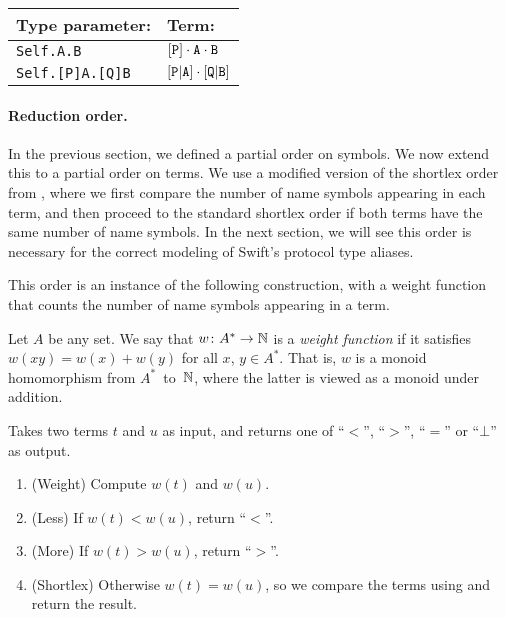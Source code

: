 \documentclass[../generics]{subfiles}
\begin{document}
\begin{center}
\begin{tabular}{ll}
\toprule
\textbf{Type parameter:}&\textbf{Term:}\\
\midrule
\texttt{Self.A.B}&$[\texttt{P}]\cdot\texttt{A}\cdot\texttt{B}$\\
\texttt{Self.[P]A.[Q]B}&$[\texttt{P}|\texttt{A}]\cdot[\texttt{Q}|\texttt{B}]$\\
\bottomrule
\end{tabular}
\end{center}

\paragraph{Reduction order.}
In the previous section, we defined a partial order on symbols. We now extend this to a partial order on terms. We use a modified version of the shortlex order from , where we first compare the number of name symbols appearing in each term, and then proceed to the standard shortlex order if both terms have the same number of name symbols. In the next section, we will see this order is necessary for the correct modeling of Swift's protocol type aliases.

This order is an instance of the following construction, with a weight function that counts the number of name symbols appearing in a term.

\begin{definition}
Let $A$ be any set. We say that $w\colon A^*\rightarrow\mathbb{N}$ is a \emph{weight function} if it satisfies $w(xy)=w(x)+w(y)$ for all $x$, $y\in A^*$. That is, $w$ is a monoid homomorphism from $A^*$~to~$\mathbb{N}$, where the latter is viewed as a monoid under addition.
\end{definition}

\begin{algorithm}\label{rqm reduction order}
Takes two terms $t$ and $u$ as input, and returns one of ``$<$'', ``$>$'', ``$=$'' or \index{$\bot$}``$\bot$'' as output.
\begin{enumerate}
\item (Weight) Compute $w(t)$ and $w(u)$.
\item (Less) If $w(t)<w(u)$, return ``$<$''.
\item (More) If $w(t)>w(u)$, return ``$>$''.
\item (Shortlex) Otherwise $w(t)=w(u)$, so we compare the terms using  and return the result.
\end{enumerate}
\end{algorithm}
\end{document}
